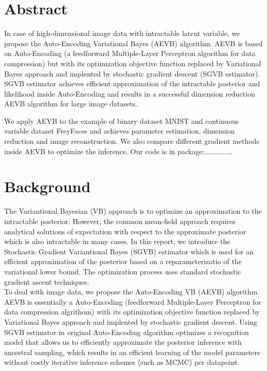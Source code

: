 \documentclass[11pt]{article}
\begin{document}
\section{Abstract}

In case of high-dimensional image data with intractable latent variable, we propose the Auto-Encoding Variational Bayes (AEVB) algorithm. AEVB is based on Auto-Encoding (a feedforward Multiple-Layer Perceptron algorithm for data compression) but with its optimization objective function replaced by Variational Bayes approach and implented by stochastic gradient descent (SGVB estimator). SGVB estimator achieves efficient approximation of the intractable posterior and likelihood inside Auto-Encoding and results in a successful dimension reduction AEVB algorithm for large image datasets.

We apply AEVB to the example of binary dataset MNIST and continuous variable dataset FreyFaces and achieves parameter estimation, dimension reduction and image reconstruction. We also compare different gradient methods inside AEVB to optimize the inference. Our code is in package:..............

\section{Background}
The Variantional Bayesian (VB) approach is to optimize an approximation to the intractable posterior. However, the common mean-field approach requires analytical solutions of expectation with respect to the approximate posterior which is also intractable in many cases. In this report, we introduce the Stochastic Gradient Variantional Bayes (SGVB) estimator which is used for an efficient approximation of the posterior  based on a reparameterizatio of the variational lower bound. The optimization process uses standard stochastic gradient ascent techniques. \\

To deal with image data, we propose the Auto-Encoding VB (AEVB) algorithm. AEVB is essentially a Auto-Encoding (feedforward Multiple-Layer Perceptron for data compression algrithom) with its optimization objective function replaced by Variational Bayes approach and implented by stochastic gradient descent. Using SGVB estimator in original Auto-Encoding algorithm optimizes a recognition model that allows us to efficiently approximate the posterior inference with ancestral sampling, which results in an efficient learning of the model parameters without costly iterative inference schemes (such as MCMC) per datapoint.\\
\end{document}
